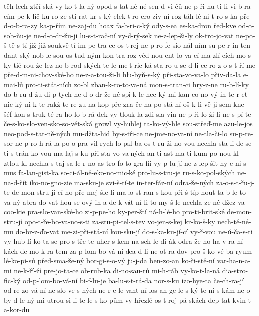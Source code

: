 těh-lech
ztří-ská
vy-ko-t-la-ný
opod-s-tat-ně-né
sen-d-vi-čů
ne-p-ři-nu-ti-li
vi-b-ra-cím
pe-k-líč-ku
ro-ze-stí-rat
kr-s-ký
elek-t-ro-ero-ziv-ní
roz-táh-lé
ni-t-ro-s-ka
pře-d-o-b-ra-zy
ka-p-řím
ne-zaj-du
hoax
fa-b-ri-c-ký
ody-s-ea
es-ka-dron
řed-kve
od-o-sob-ňu-je
ne-d-o-dr-žu-ji
lu-s-t-rač-ní
vy-d-rý-sek
ne-z-lep-ši-ly
ok-tro-jo-vat
ne-po-š-tě-s-tí
již-již
soukvě-tí
im-pe-tra-ce
os-t-rej
ne-p-ro-fe-sio-nál-ním
su-pe-r-in-ten-dant-ský
nob-le-sou
os-tud-ným
kon-tra-roz-věd-nou
ent-lo-va-cí
ma-zlí-cích
mo-s-ky-tié-rou
že-lez-no-b-rod-ských
te-le-me-t-ric-ká
sta-ro-u-se-d-li-ce
ro-z-o-s-t-ří-me
pře-d-m-ni-chov-ské-ho
ne-z-a-tou-ži-li
hlu-byň-s-ký
při-sta-vo-va-lo
přiv-da-la
e-mai-lů
pro-ti-stát-ních
zo-bl
zban-k-ro-to-va-ná
mon-s-tran-ci
hry-z-ne
ru-b-lí-ky
do-b-ru-d-žu
di-p-tych
ne-d-o-dr-že-né
spi-k-le-nec-ký-mi
kan-co-no-vý
in-te-r-et-nic-ký
ni-k-te-rakž
te-re-zu
na-kop
pře-zna-če-na
po-stá-ní
oš-k-li-vě-ji
sem-kne
šéf-kon-s-truk-té-ra
ho-lo-b-rá-dek
vy-tlouk-la
zdi-sla-vin
ne-p-ři-lo-ži-li
ne-s-pí-te
če-s-ko-slo-ven-sko-so-vět-ská
growl
vy-hublej
ta-ko-vý-hle
sou-střeď-me
azu-le-jos
neo-pod-s-tat-ně-ných
mu-džta-hid
by-s-tři-ce
ne-jme-no-va-ní
ne-tla-či-lo
su-p-re-sor
ne-p-ro-h-rá-la
po-o-pra-vil
rych-lo-pal-ba
os-t-ru-ži-no-vou
nechla-sta-li
de-se-ti-s-trán-ko-vou
ma-laj-s-ku
při-sta-vo-va-ných
an-ti-ast-ma-ti-kum
po-nou-kl
ztlou-kl
nechla-s-taj
sa-le-r-no
as-tro-fo-to-gra-fií
vy-p-lu-jí
ne-z-lep-šit
hy-e-ni-s-mus
fa-lan-gist-ka
so-ci-ál-ně-eko-no-mic-ké
pro-lu-s-tru-je
ru-s-ko-pol-ských
ne-na-d-řít
iko-no-gno-zie
ma-sku-je
svi-š-tí-te
in-ter-fáz-ní
odra-že-ných
za-o-s-t-řu-j-te
de-mon-stru-jí-cí-ho
pře-mej-šle-li
ma-lo-st-ran-s-kou
při-š-típ-nout
ta-b-le-to-va-ný
abra-do-vat
hou-se-ový
in-a-de-k-vát-ní
li-to-my-š-le
nechla-ze-né
džez-va
coo-kie
pra-slo-van-ské-ho
zi-p-pe-ho
ky-per-ští
ná-h-lé-ho
pro-ti-brit-ské
de-mon-stru-jí
opo-t-ře-bo-va-no-s-ti
za-stu-pi-tel-s-tev
vo-jen-s-kej
kr-ko-š-ky
nech-tě-né-mu
do-br-z-ďo-vat
me-zi-při-stá-ní
kou-sku-jí
do-s-ka-ku-jí-cí
vy-ř-vou
ne-ú-ča-s-ti
vy-hub-lí
ko-ta-se
pro-s-tře-te
uher-s-kem
na-sch-le
di-ák
odra-že-no
ha-v-ra-ní-kách
de-mo-k-ra-tem
za-p-lom-bo-vá-ní
dea-d-li-ne
ot-ra-dov
pro-š-ko-vé
ba-ryum
lé-ko-pi-sů
před-sma-že-ný
bor-gi-s-o-vý
ju-j-da
ben-zo-an
ko-ři-stě-ní
var-ha-n-a-mi
ne-k-ří-ží
pre-jo-ta-ce
ob-rub-ka
di-no-sau-rů
mi-h-ráb
vy-ko-t-la-ná
dia-stro-fic-ký
od-p-lom-bo-vá-ní
bi-f-lu-je
ba-lu-s-t-rá-da
nor-s-ku
izo-hye-ta
če-ch-ra-jí
od-re-zo-vá-ní
ne-slo-ve-s-ných
ne-r-e-le-vant-ní
los-an-ge-le-s-ký
te-ni-s-kám
ne-o-by-d-le-ný-mi
utrou-si-li
te-le-s-ko-pům
vy-hřezlé
os-t-roj
pá-skách
dep-tat
kvin-t-a-kor-du
